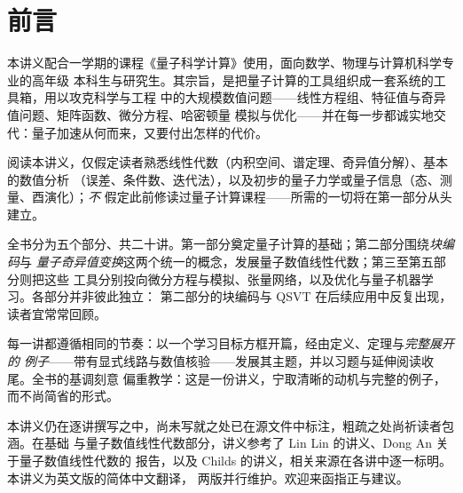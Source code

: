 \chapter*{前言}

本讲义配合一学期的课程《量子科学计算》使用，面向数学、物理与计算机科学专业的高年级
本科生与研究生。其宗旨，是把量子计算的工具组织成一套系统的工具箱，用以攻克科学与工程
中的大规模数值问题——线性方程组、特征值与奇异值问题、矩阵函数、微分方程、哈密顿量
模拟与优化——并在每一步都诚实地交代：量子加速从何而来，又要付出怎样的代价。

阅读本讲义，仅假定读者熟悉线性代数（内积空间、谱定理、奇异值分解）、基本的数值分析
（误差、条件数、迭代法），以及初步的量子力学或量子信息（态、测量、酉演化）；\emph{不}
假定此前修读过量子计算课程——所需的一切将在第一部分从头建立。

全书分为五个部分、共二十讲。第一部分奠定量子计算的基础；第二部分围绕\emph{块编码}与
\emph{量子奇异值变换}这两个统一的概念，发展量子数值线性代数；第三至第五部分则把这些
工具分别投向微分方程与模拟、张量网络，以及优化与量子机器学习。各部分并非彼此独立：
第二部分的块编码与 QSVT 在后续应用中反复出现，读者宜常常回顾。

每一讲都遵循相同的节奏：以一个学习目标方框开篇，经由定义、定理与\emph{完整展开的
例子}——带有显式线路与数值核验——发展其主题，并以习题与延伸阅读收尾。全书的基调刻意
偏重教学：这是一份讲义，宁取清晰的动机与完整的例子，而不尚简省的形式。

本讲义仍在逐讲撰写之中，尚未写就之处已在源文件中标注，粗疏之处尚祈读者包涵。在基础
与量子数值线性代数部分，讲义参考了 Lin Lin 的讲义、Dong An 关于量子数值线性代数的
报告，以及 Childs 的讲义，相关来源在各讲中逐一标明。本讲义为英文版的简体中文翻译，
两版并行维护。欢迎来函指正与建议。
